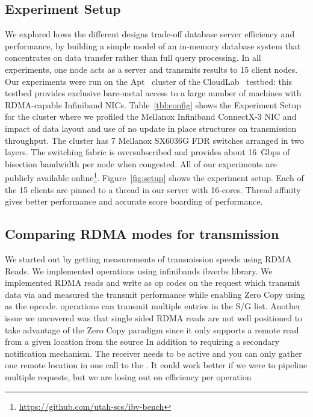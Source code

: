 \subsection{Experiment Setup}

We explored hows the different designs trade-off database server efficiency and
performance, by building a simple model of an in-memory database system that
concentrates on data transfer rather than full query processing. In all experiments,
one node acts as a server and transmits results to 15 client nodes.
Our experiments were run on the Apt~\cite{Ricci+:OSR15} cluster of the
CloudLab~\cite{Cloudlab:URL} testbed: this testbed provides exclusive bare-metal
access to a large number of machines with RDMA-capable Infiniband NICs.
Table~\ref{tbl:config} shows the Experiment Setup for the cluster where we profiled
the Mellanox Infiniband ConnectX-3 \textregistered NIC and impact of data layout and 
use of no update in place structures on transmission throughput. The cluster has 7
Mellanox SX6036G FDR switches arranged in two layers. The switching fabric is
oversubscribed and provides about 16~Gbps of bisection bandwidth per node
when congested. All of our experiments are publicly available online\footnote{\url{https://github.com/utah-scs/ibv-bench}}.
Figure~\ref{fig:setup} shows the experiment setup. Each of the 15 clients are pinned to a thread in our server with 16-cores. 
Thread affinity gives better performance and accurate score boarding of performance.







\subsection{Comparing RDMA modes for transmission}
We started out by getting measurements of transmission speeds using RDMA Reads.
We implemented operations using infinibands ibverbs library. We implemented 
RDMA reads and write as op codes on the  request which 
transmit data via  and measured the transmit 
performance while enabling Zero Copy using  as the opcode.
 operations can transmit multiple entries in the S/G list.
Another issue we uncovered was that single sided RDMA reads are not well positioned to 
take advantage of the Zero Copy paradigm since it only supports a remote read 
from a given location from the source In addition to requiring a secondary notification mechanism.
 The receiver needs to be active and you can  only gather one remote location in one call to the .
It could work better if we were to pipeline multiple requests, but we are losing out on efficiency per operation

